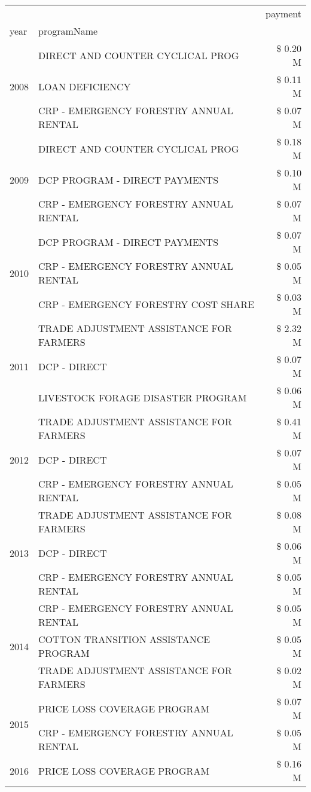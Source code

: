 \begin{tabular}{llr}
\toprule
 &  & payment \\
year & programName &  \\
\midrule
\multirow[t]{3}{*}{2008} & DIRECT AND COUNTER CYCLICAL PROG & \$ 0.20 M \\
 & LOAN DEFICIENCY & \$ 0.11 M \\
 & CRP - EMERGENCY FORESTRY ANNUAL RENTAL & \$ 0.07 M \\
\cline{1-3}
\multirow[t]{3}{*}{2009} & DIRECT AND COUNTER CYCLICAL PROG & \$ 0.18 M \\
 & DCP PROGRAM - DIRECT PAYMENTS & \$ 0.10 M \\
 & CRP - EMERGENCY FORESTRY ANNUAL RENTAL & \$ 0.07 M \\
\cline{1-3}
\multirow[t]{3}{*}{2010} & DCP PROGRAM - DIRECT PAYMENTS & \$ 0.07 M \\
 & CRP - EMERGENCY FORESTRY ANNUAL RENTAL & \$ 0.05 M \\
 & CRP - EMERGENCY FORESTRY COST SHARE & \$ 0.03 M \\
\cline{1-3}
\multirow[t]{3}{*}{2011} & TRADE ADJUSTMENT ASSISTANCE FOR FARMERS & \$ 2.32 M \\
 & DCP - DIRECT & \$ 0.07 M \\
 & LIVESTOCK FORAGE DISASTER PROGRAM & \$ 0.06 M \\
\cline{1-3}
\multirow[t]{3}{*}{2012} & TRADE ADJUSTMENT ASSISTANCE FOR FARMERS & \$ 0.41 M \\
 & DCP - DIRECT & \$ 0.07 M \\
 & CRP - EMERGENCY FORESTRY ANNUAL RENTAL & \$ 0.05 M \\
\cline{1-3}
\multirow[t]{3}{*}{2013} & TRADE ADJUSTMENT ASSISTANCE FOR FARMERS & \$ 0.08 M \\
 & DCP - DIRECT & \$ 0.06 M \\
 & CRP - EMERGENCY FORESTRY ANNUAL RENTAL & \$ 0.05 M \\
\cline{1-3}
\multirow[t]{3}{*}{2014} & CRP - EMERGENCY FORESTRY ANNUAL RENTAL & \$ 0.05 M \\
 & COTTON TRANSITION ASSISTANCE PROGRAM & \$ 0.05 M \\
 & TRADE ADJUSTMENT ASSISTANCE FOR FARMERS & \$ 0.02 M \\
\cline{1-3}
\multirow[t]{2}{*}{2015} & PRICE LOSS COVERAGE PROGRAM & \$ 0.07 M \\
 & CRP - EMERGENCY FORESTRY ANNUAL RENTAL & \$ 0.05 M \\
\cline{1-3}
\multirow[t]{3}{*}{2016} & PRICE LOSS COVERAGE PROGRAM & \$ 0.16 M \\

\end{tabular}
